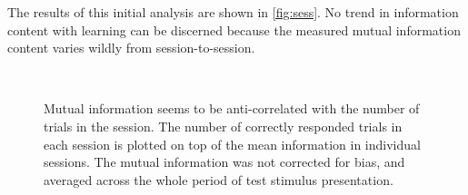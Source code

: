 The results of this initial analysis are shown in \autoref{fig:sess}.
No trend in information content with learning can be discerned because the measured mutual information content varies wildly from session-to-session.



%
%
% 
% 
\begin{figure}[htbp]
    \\
    \caption{Mutual information seems to be anti-correlated with the number of trials in the session. The number of correctly responded trials in each session is plotted on top of the mean information in individual sessions. The mutual information was not corrected for bias, and averaged across the whole period of test stimulus presentation.
}
    \label{fig:IandN}
\end{figure}

